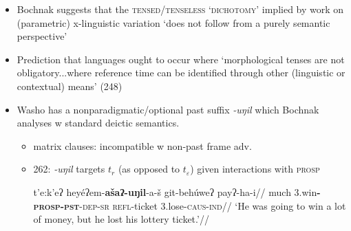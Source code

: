 \documentclass[10pt]{article}
\begin{document}
\begin{itemize}
	\item Bochnak suggests that the \textsc{tensed/tenseless `dichotomy'} implied by work on (parametric) x-linguistic variation `does not follow from a purely semantic perspective'
	\item Prediction that languages ought to occur where `morphological tenses are not obligatory...where reference time can be identified through other (linguistic or contextual) means' (248)
	\item Washo has a nonparadigmatic/optional past suffix \textit{-uŋil} which Bochnak analyses w standard deictic semantics.
		\begin{itemize}
			\item matrix clauses: incompatible w non-past frame adv.
			\item 262: \textit{-uŋil} targets $t_r$ (as opposed to $ t_\varepsilon $) given interactions with \textsc{prosp}
			
			\pex \begingl\gla t'e:k'eʔ heyéʔem-\textbf{ašaʔ-uŋil}-a-š git-behúweʔ payʔ-ha-i//
			\glb much 3.win\textsc{\textbf{-prosp-pst}-dep-sr} \textsc{refl}-ticket 3.lose\textsc{-caus-ind}//
			\glft`He was going to win a lot of money, but he lost his lottery ticket.'//\endgl\xe
			
		\end{itemize}
	

\end{itemize}
\end{document}
